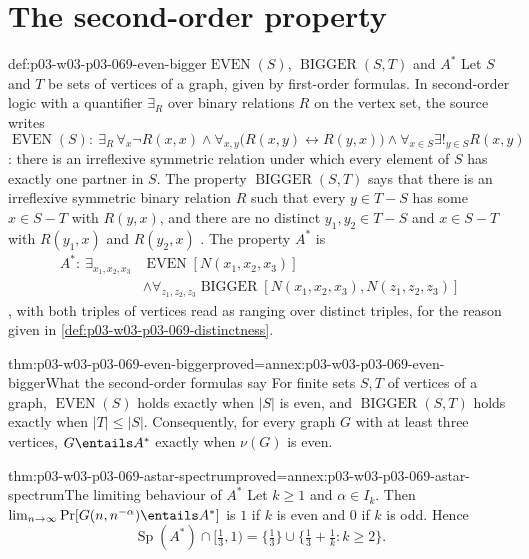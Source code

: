 \section{The second-order property}
\label{sec:p03-w03-p03-069-second-order}

\begin{hbdefinition}{def:p03-w03-p03-069-even-bigger}{\(\operatorname{EVEN}(S)\), \(\operatorname{BIGGER}(S,T)\) and \(A^*\)}
Let \(S\) and \(T\) be sets of vertices of a graph, given by first-order
formulas.  In second-order logic with a quantifier \(\exists_R\) over binary
relations \(R\) on the vertex set, the source writes
\[
  \operatorname{EVEN}(S):\ \exists_R\,
  \forall_x\neg R(x,x)\wedge\forall_{x,y}\bigl(R(x,y)\leftrightarrow R(y,x)\bigr)
  \wedge\forall_{x\in S}\exists!_{y\in S}R(x,y)
\]
\cite[p.~16]{Spencer2007LogicRandomStructuresAuthor}: there is an
irreflexive symmetric relation under which every element of \(S\) has exactly
one partner in \(S\).  The property \(\operatorname{BIGGER}(S,T)\) says that
there is an irreflexive symmetric binary relation \(R\) such that every
\(y\in T-S\) has some \(x\in S-T\) with \(R(y,x)\), and there are no distinct
\(y_1,y_2\in T-S\) and \(x\in S-T\) with \(R(y_1,x)\) and \(R(y_2,x)\)
\cite[p.~16]{Spencer2007LogicRandomStructuresAuthor}.  The property \(A^*\)
is
\[
  \begin{aligned}
  A^*:\ \exists_{x_1,x_2,x_3}&\operatorname{EVEN}[N(x_1,x_2,x_3)]\\
  &\wedge\forall_{z_1,z_2,z_3}\operatorname{BIGGER}[N(x_1,x_2,x_3),N(z_1,z_2,z_3)]
  \end{aligned}
\]
\cite[p.~16]{Spencer2007LogicRandomStructuresAuthor}, with both triples of
vertices read as ranging over distinct triples, for the reason given in
\cref{def:p03-w03-p03-069-distinctness}.
\end{hbdefinition}

\begin{hblemma}{thm:p03-w03-p03-069-even-bigger}{proved=annex:p03-w03-p03-069-even-bigger}{What the second-order formulas say}
For finite sets \(S,T\) of vertices of a graph,
\(\operatorname{EVEN}(S)\) holds exactly when \(|S|\) is even, and
\(\operatorname{BIGGER}(S,T)\) holds exactly when \(|T|\leq|S|\).
Consequently, for every graph \(G\) with at least three vertices,
\(G\entails A^*\) exactly when \(\nu(G)\) is even.
\end{hblemma}

\begin{hbtheorem}{thm:p03-w03-p03-069-astar-spectrum}{proved=annex:p03-w03-p03-069-astar-spectrum}{The limiting behaviour of \(A^*\)}
Let \(k\geq1\) and \(\alpha\in I_k\).  Then
\(\lim_{n\to\infty}\Pr[G(n,n^{-\alpha})\entails A^*]\) is \(1\) if \(k\) is
even and \(0\) if \(k\) is odd.  Hence
\[
  \operatorname{Sp}(A^*)\cap\bigl[\tfrac13,1\bigr)
  =\{\tfrac13\}\cup\bigl\{\tfrac13+\tfrac1k : k\geq2\bigr\}.
\]
\end{hbtheorem}

